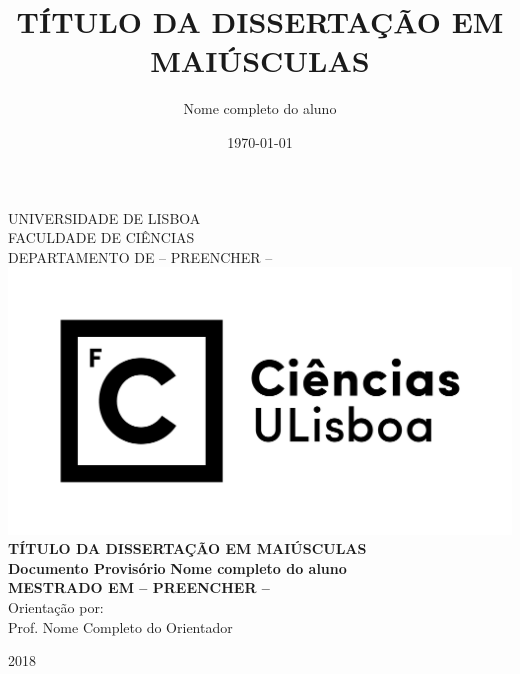 \documentclass[11pt,openright,twoside]{report}
\numberwithin{equation}{chapter}
\newcommand{\TITULO}{TÍTULO DA DISSERTAÇÃO EM MAIÚSCULAS}
\newcommand{\Autor}{Nome completo do aluno}
\newcommand{\Orientador}{Nome Completo do Orientador}
\newcommand{\CoOrientador}{Nome Completo do Co-Orientador} %
\newcommand{\SupervisorInstituicao}{Nome Completo do Supervisor}  %
\newcommand{\Ano}{\Large{2018}}
\newcommand{\MESTRADO}{MESTRADO EM -- PREENCHER --}
\newcommand{\IdiomaTese}{\selectlanguage{portuguese}}
\begin{document}
\title{\TITULO}
\author{\Autor}
\date{\today}


\pagestyle{empty}


\begin{center}
\vspace{1cm}\normalfont\normalfont
\vfill
\textsc{\normalsize\uppercase{Universidade de Lisboa}}\\
\normalsize\uppercase{Faculdade de Ciências}\\
\normalsize\uppercase{Departamento de -- PREENCHER --}\\
\vspace{1cm}
\includegraphics[scale=.45]{images/logo_fcul.png}\\

\vspace{2.5cm}
\vfill
\IdiomaTese
\Large{\bf \TITULO}\\
\vspace{1.3cm}
\normalsize{\bf{Documento Provisório}}
\vspace{1cm}
\vfill
\Large{\bf \Autor}\\
\vspace{1,8 cm}
\vfill
\large{\bf{\MESTRADO}}\\
\vspace{2.3cm}
\vfill
\large{Orientação por:}\\
\large{Prof. \Orientador} \\
\vspace{1.5 cm}
\vfill

\vfill
\Ano
\end{center}
\end{document}
